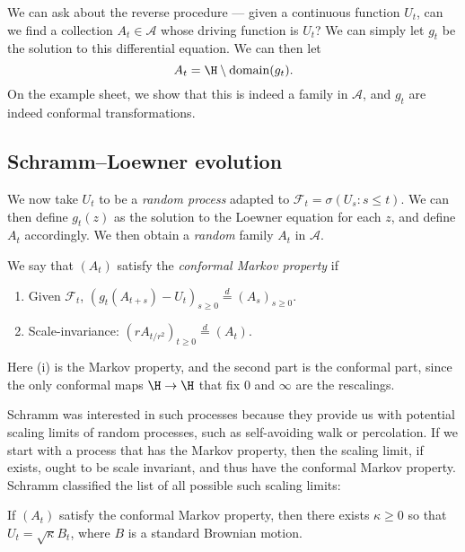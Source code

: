 \documentclass[a4paper]{article}
\begin{document}
We can ask about the reverse procedure --- given a continuous function $U_t$, can we find a collection $A_t \in \mathcal{A}$ whose driving function is $U_t$? We can simply let $g_t$ be the solution to this differential equation. We can then let
\[
  A_t = \H \setminus \mathrm{domain}(g_t).
\]
On the example sheet, we show that this is indeed a family in $\mathcal{A}$, and $g_t$ are indeed conformal transformations.

\subsection{Schramm--Loewner evolution}
We now take $U_t$ to be a \emph{random process} adapted to $\mathcal{F}_t = \sigma(U_s: s \leq t)$. We can then define $g_t(z)$ as the solution to the Loewner equation for each $z$, and define $A_t$ accordingly. We then obtain a \emph{random} family $A_t$ in $\mathcal{A}$.

\begin{defi}
  We say that $(A_t)$ satisfy the \emph{conformal Markov property} if
  \begin{enumerate}
    \item Given $\mathcal{F}_t$, $(g_t(A_{t + s}) - U_t)_{s \geq 0} \overset{d}{=} (A_s)_{s \geq 0}$.
    \item Scale-invariance: $(r A_{t/r^2} )_{t \geq 0} \overset{d}{=} (A_t)$.
  \end{enumerate}
\end{defi}
Here (i) is the Markov property, and the second part is the conformal part, since the only conformal maps $\H \to \H$ that fix $0$ and $\infty$ are the rescalings.

Schramm was interested in such processes because they provide us with potential scaling limits of random processes, such as self-avoiding walk or percolation. If we start with a process that has the Markov property, then the scaling limit, if exists, ought to be scale invariant, and thus have the conformal Markov property. Schramm classified the list of all possible such scaling limits:

\begin{thm}[Schramm]
  If $(A_t)$ satisfy the conformal Markov property, then there exists $\kappa \geq 0$ so that $U_t = \sqrt{\kappa} B_t$, where $B$ is a standard Brownian motion.
\end{thm}
\end{document}
